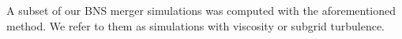 A subset of our \ac{BNS} merger simulations was computed 
with the aforementioned method. 
We refer to them as simulations with viscosity or subgrid turbulence. 


%









